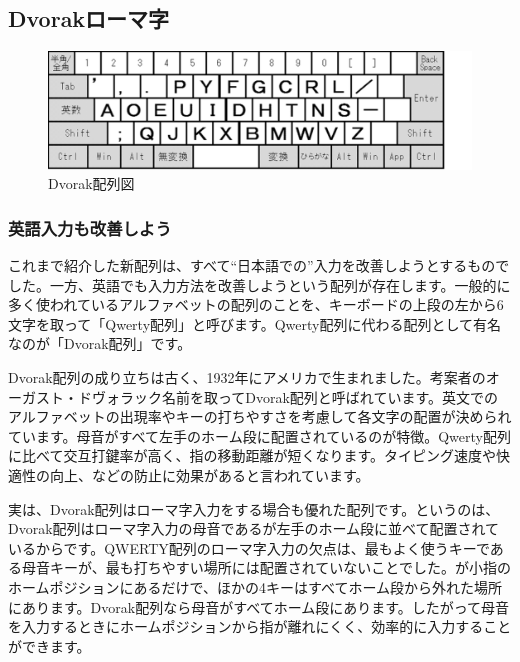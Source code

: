 \subsection{Dvorakローマ字}


\begin{figure}
 \begin{center}
   \includegraphics[width=14cm,clip]{res_kouy/Dvorak.eps}
 \end{center}
 \caption{Dvorak配列図}
 \label{Dvorak}
\end{figure}

\subsubsection*{英語入力も改善しよう}

これまで紹介した新配列は、すべて“日本語での”入力を改善しようとするものでした。一方、英語でも入力方法を改善しようという配列が存在します。一般的に多く使われているアルファベットの配列のことを、キーボードの上段の左から6文字を取って「Qwerty配列」と呼びます。Qwerty配列に代わる配列として有名なのが「Dvorak配列」です。

Dvorak配列の成り立ちは古く、1932年にアメリカで生まれました。考案者のオーガスト・ドヴォラック名前を取ってDvorak配列と呼ばれています。英文でのアルファベットの出現率やキーの打ちやすさを考慮して各文字の配置が決められています。母音がすべて左手のホーム段に配置されているのが特徴。Qwerty配列に比べて交互打鍵率が高く、指の移動距離が短くなります。タイピング速度や快適性の向上、などの防止に効果があると言われています。

実は、Dvorak配列はローマ字入力をする場合も優れた配列です。というのは、Dvorak配列はローマ字入力の母音であるが左手のホーム段に並べて配置されているからです。QWERTY配列のローマ字入力の欠点は、最もよく使うキーである母音キーが、最も打ちやすい場所には配置されていないことでした。が小指のホームポジションにあるだけで、ほかの4キーはすべてホーム段から外れた場所にあります。Dvorak配列なら母音がすべてホーム段にあります。したがって母音を入力するときにホームポジションから指が離れにくく、効率的に入力することができます。

